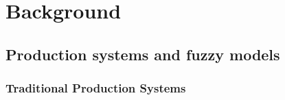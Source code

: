 \chapter{Background}
\section{Production systems and fuzzy models}

\subsection{Traditional Production Systems}

